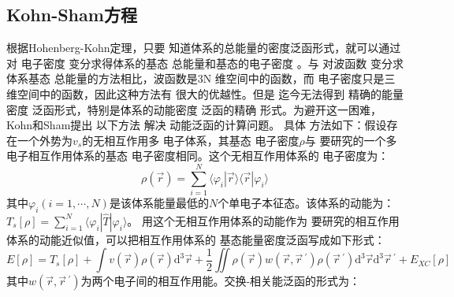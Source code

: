 \subsection{Kohn-Sham方程}
{根据}Hohenberg-Kohn定理，只要%
{知道}体系的总能量的{密度}泛函形式，就可以通过对%
{电}子密度%
变分求得体系的基态%
{总能量和基态的电}子密度%
。与%
对波函数%
变分求%
体系基态%
{总能量}的方法相比，波函数是3N%
{维空间中的}函数，而%
{电}子密度只是三维{空间中的}函数，因此这种方法有%
{很}大的优越性。但是%
{迄今无法}得到%
精确的能量密度
泛函形式，特别是体系的动能密度
泛函的精确%
{形式。为避开这一困难}，Kohn和Sham提出%
{以下}方法%
解决%
动能泛函的计算问题。%
具体%
方法如下：假设存在一个外势为$v_s$的无相互作用多%
{电}子体系，其基态%
{电}子密度$\rho$与%
{要}研究的一个多电子相互作用体系的基态%
{电}子密度相同。这个无相互作用体系的%
{电}子密度为：
$$\rho(\vec{r})=\sum_{i=1}^{N}\langle\varphi_{i}|\vec{r}\rangle\langle\vec{r}|\varphi_{i}\rangle$$
其中$\varphi_i(i\!=\!1,\cdots,N)$是该体系能量最低的$N$个{单电子}本征态。该体系的动能为：\linebreak $T_{s}[\rho]\!=\!\sum\limits_{i=1}^{N}\langle\varphi_{i}|\hat{T}|\varphi_{i}\rangle$。
用这个无相互作用体系的动能作为%
{要}研究的相互作用体系的动能近似{值}，可以把相互作用体系的%
{基态能量密度泛函}写成如下形式：
\begin{equation}
  \label{eq:dft-1}
E[\rho]=T_{s}[\rho]+\int{v(\vec{r})\rho(\vec{r})\textrm{d}^3\vec{r}}+\frac 12\iint{\rho(\vec{r})w(\vec{r},\vec r\,^{\prime})\rho(\vec r\,^{\prime})\textrm{d}^3\vec{r}\textrm{d}^3\vec r\,^{\prime}}+E_{XC}[\rho]
\end{equation}
其中{$w(\vec r, \vec r\,^{\prime})$为两个电子间的相互作用能。}交换-相关能泛函的形式为：

